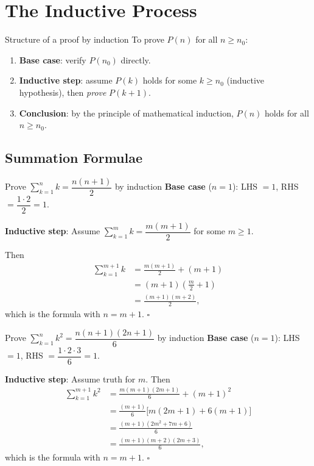 \documentclass[12pt,a4paper]{article}
\theoremstyle{defstyle}
\newcommand{\sumk}{\sum_{k=1}^{n}}
\begin{document}
\section{The Inductive Process}

\begin{result}{Structure of a proof by induction}{}
To prove \(P(n)\) for all \(n\geq n_0\):
\begin{enumerate}[nosep]
  \item \textbf{Base case}: verify \(P(n_0)\) directly.
  \item \textbf{Inductive step}: assume \(P(k)\) holds for some \(k\geq n_0\) (inductive hypothesis), then \emph{prove} \(P(k+1)\).
  \item \textbf{Conclusion}: by the principle of mathematical induction, \(P(n)\) holds for all \(n\geq n_0\).
\end{enumerate}
\end{result}

\subsection{Summation Formulae}

\begin{example}{Prove $\displaystyle\sumk k = \dfrac{n(n+1)}{2}$ by induction}{}
\textbf{Base case} (\(n=1\)): LHS \(=1\), RHS \(=\dfrac{1\cdot2}{2}=1\). \checkmark

\textbf{Inductive step}: Assume \(\displaystyle\sum_{k=1}^{m}k=\dfrac{m(m+1)}{2}\) for some \(m\geq1\).

Then
\[
\begin{aligned}
  \sum_{k=1}^{m+1}k &= \frac{m(m+1)}{2}+(m+1) \\[4pt]
                    &= (m+1)\left(\frac{m}{2}+1\right) \\[4pt]
                    &= \frac{(m+1)(m+2)}{2},
\end{aligned}
\]
which is the formula with \(n=m+1\). \(\square\)
\end{example}

\begin{example}{Prove $\displaystyle\sumk k^2 = \dfrac{n(n+1)(2n+1)}{6}$ by induction}{}
\textbf{Base case} (\(n=1\)): LHS \(=1\), RHS \(=\dfrac{1\cdot2\cdot3}{6}=1\). \checkmark

\textbf{Inductive step}: Assume truth for \(m\). Then
\[
\begin{aligned}
  \sum_{k=1}^{m+1}k^2 &= \frac{m(m+1)(2m+1)}{6}+(m+1)^2 \\[4pt]
  &= \frac{(m+1)}{6}\bigl[m(2m+1)+6(m+1)\bigr] \\[4pt]
  &= \frac{(m+1)(2m^2+7m+6)}{6} \\[4pt]
  &= \frac{(m+1)(m+2)(2m+3)}{6},
\end{aligned}
\]
which is the formula with \(n=m+1\). \(\square\)
\end{example}
\end{document}
